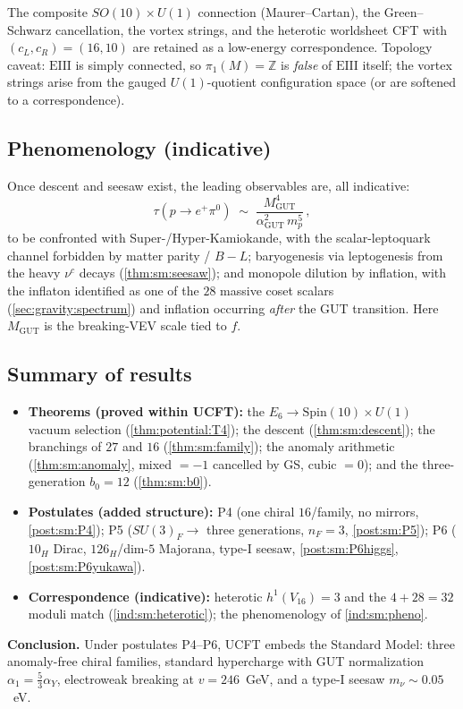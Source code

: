 \begin{remark}\label{rem:sm:strings}
The composite $SO(10)\times U(1)$ connection (Maurer--Cartan), the Green--Schwarz
cancellation, the vortex strings, and the heterotic worldsheet CFT with
$(c_L,c_R)=(16,10)$ are retained as a low-energy correspondence. Topology caveat:
$\mathrm{EIII}$ is simply connected, so $\pi_1(M)=\mathbb{Z}$ is \emph{false} of
$\mathrm{EIII}$ itself; the vortex strings arise from the gauged $U(1)$-quotient
configuration space (or are softened to a correspondence).
\end{remark}

\subsection{Phenomenology (indicative)}
\label{sec:sm:pheno}

\begin{indicative}\label{ind:sm:pheno}
Once descent and seesaw exist, the leading observables are, all indicative:
\begin{equation}\label{eq:sm:proton}
\tau(p\to e^+\pi^0)\;\sim\;\frac{M_{\mathrm{GUT}}^4}{\alpha_{\mathrm{GUT}}^2\,m_p^5}\,,
\end{equation}
to be confronted with Super-/Hyper-Kamiokande, with the scalar-leptoquark channel
forbidden by matter parity / $B\!-\!L$; baryogenesis via leptogenesis from the heavy
$\nu^c$ decays (\autoref{thm:sm:seesaw}); and monopole dilution by inflation, with the
inflaton identified as one of the $28$ massive coset scalars
(\autoref{sec:gravity:spectrum}) and inflation occurring \emph{after} the GUT
transition. Here $M_{\mathrm{GUT}}$ is the breaking-VEV scale tied to $f$.
\end{indicative}

\subsection{Summary of results}
\label{sec:sm:summary}

\begin{itemize}
\item \textbf{Theorems (proved within UCFT):} the $E_6\to\mathrm{Spin}(10)\times U(1)$
vacuum selection (\autoref{thm:potential:T4}); the descent
(\autoref{thm:sm:descent}); the branchings of $27$ and $16$
(\autoref{thm:sm:family}); the anomaly arithmetic
(\autoref{thm:sm:anomaly}, mixed $=-1$ cancelled by GS, cubic $=0$); and the
three-generation $b_0=12$ (\autoref{thm:sm:b0}).
\item \textbf{Postulates (added structure):} P4 (one chiral $16$/family, no mirrors,
\autoref{post:sm:P4}); P5 ($SU(3)_F\to$ three generations, $n_F=3$,
\autoref{post:sm:P5}); P6 ($10_H$ Dirac, $126_H$/dim-$5$ Majorana, type-I seesaw,
\autoref{post:sm:P6higgs}, \autoref{post:sm:P6yukawa}).
\item \textbf{Correspondence (indicative):} heterotic $h^1(V_{16})=3$ and the
$4+28=32$ moduli match (\autoref{ind:sm:heterotic}); the phenomenology of
\autoref{ind:sm:pheno}.
\end{itemize}

\noindent\textbf{Conclusion.} Under postulates P4--P6, UCFT embeds the Standard
Model: three anomaly-free chiral families, standard hypercharge with GUT
normalization $\alpha_1=\tfrac53\alpha_Y$, electroweak breaking at $v=246$~GeV, and a
type-I seesaw $m_\nu\sim0.05$~eV.
